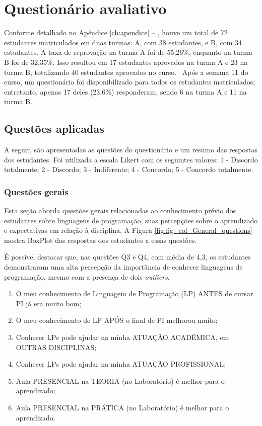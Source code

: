   
\section{Questionário avaliativo}

Conforme detalhado no Apêndice \ref{ch:apendice} -- , houve um total de 72 estudantes matriculados em duas turmas: A, com 38 estudantes, e B, com 34 estudantes. A taxa de reprovação na turma A foi de 55,26\%, enquanto na turma B foi de 32,35\%. Isso resultou em 17 estudantes aprovados na turma A e 23 na turma B, totalizando 40 estudantes aprovados no curso.
\
Após a semana 11 do curso, um questionário foi disponibilizado para todos os estudantes matriculados; entretanto, apenas 17 deles (23.6\%) responderam, sendo 6 na turma A e 11 na turma B. 

\subsection{Questões aplicadas}

A seguir, são apresentadas as questões do questionário e um resumo das respostas dos estudantes. Foi utilizada a escala Likert com os seguintes valores: 1 - Discordo totalmente; 2 - Discordo; 3 - Indiferente; 4 - Concordo; 5 - Concordo totalmente.

\subsubsection{Questões gerais}

Esta seção aborda questões gerais relacionadas ao conhecimento prévio dos estudantes sobre linguagens de programação, suas percepções sobre o aprendizado e expectativas em relação à disciplina. A Figura \ref{fig:fig_col_General_questions} mostra BoxPlot \cite{tukey1977box} das respostas dos estudantes a essas questões.

É possível destacar que, nas questões Q3 e Q4, com média de 4,3, os estudantes demonstraram uma alta percepção da importância de conhecer linguagens de programação, mesmo com a presença de dois \textit{outliers}.

\begin{enumerate}[label=\textbf{Q\arabic*.}, itemsep=0pt, parsep=0pt, topsep=0pt, leftmargin=*, before=\ttfamily, after=\normalfont]
    \fontsize{9}{11}\selectfont
    \item O meu conhecimento de Linguagem de Programação (LP) ANTES de cursar PI já era muito bom;
    \item O meu conhecimento de LP APÓS o final de PI melhorou muito;
    \item Conhecer LPs pode ajudar na minha ATUAÇÃO ACADÊMICA, em OUTRAS DISCIPLINAS;
    \item Conhecer LPs pode ajudar na minha ATUAÇÃO PROFISSIONAL;
    \item Aula PRESENCIAL na TEORIA (no Laboratório) é melhor para o aprendizado;
    \item Aula PRESENCIAL na PRÁTICA (no Laboratório) é melhor para o aprendizado.
\end{enumerate}

